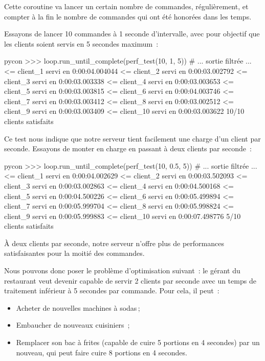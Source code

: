 \documentclass[small]{zmdocument}
\begin{document}
Cette coroutine va lancer un certain nombre de commandes, régulièrement, et
compter à la fin le nombre de commandes qui ont été honorées dans les temps.



Essayons de lancer 10 commandes à 1 seconde d’intervalle, avec pour
objectif que les clients soient servis en 5 secondes maximum :



\begin{CodeBlock}{pycon}
>>> loop.run_until_complete(perf_test(10, 1, 5))
# ... sortie filtrée ...
<= client_1 servi en 0:00:04.004044
<= client_2 servi en 0:00:03.002792
<= client_3 servi en 0:00:03.003338
<= client_4 servi en 0:00:03.003653
<= client_5 servi en 0:00:03.003815
<= client_6 servi en 0:00:04.003746
<= client_7 servi en 0:00:03.003412
<= client_8 servi en 0:00:03.002512
<= client_9 servi en 0:00:03.003409
<= client_10 servi en 0:00:03.003622
10/10 clients satisfaits
\end{CodeBlock}



Ce test nous indique que notre serveur tient facilement une charge d’un client
par seconde. Essayons de monter en charge en passant à deux clients par
seconde :



\begin{CodeBlock}{pycon}
>>> loop.run_until_complete(perf_test(10, 0.5, 5))
# ... sortie filtrée ...
<= client_1 servi en 0:00:04.002629
<= client_2 servi en 0:00:03.502093
<= client_3 servi en 0:00:03.002863
<= client_4 servi en 0:00:04.500168
<= client_5 servi en 0:00:04.500226
<= client_6 servi en 0:00:05.499894
<= client_7 servi en 0:00:05.999704
<= client_8 servi en 0:00:05.998824
<= client_9 servi en 0:00:05.999883
<= client_10 servi en 0:00:07.498776
5/10 clients satisfaits
\end{CodeBlock}



À deux clients par seconde, notre serveur n’offre plus de performances
satisfaisantes pour la moitié des commandes.



Nous pouvons donc poser le problème d’optimisation suivant : le gérant du
restaurant veut devenir capable de servir 2 clients par seconde avec un temps
de traitement inférieur à 5 secondes par commande. Pour cela, il peut :



\begin{itemize}
\item\relax Acheter de nouvelles machines à sodas ;
\item\relax Embaucher de nouveaux cuisiniers ;
\item\relax Remplacer son bac à frites (capable de cuire 5 portions en 4 secondes) par un
nouveau, qui peut faire cuire 8 portions en 4 secondes.
\end{itemize}
\end{document}
